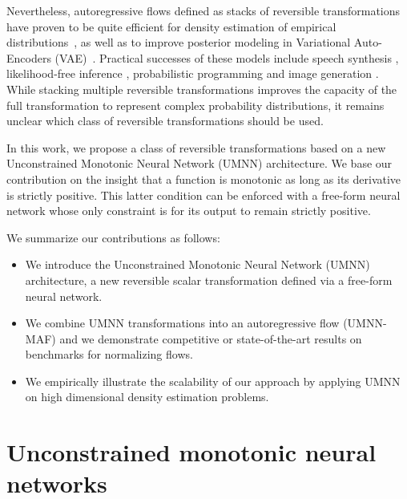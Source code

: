 Nevertheless, autoregressive flows defined as stacks of reversible transformations have proven to be quite efficient for density estimation of empirical distributions~\citep{papamakarios_sequential_2019, papamakarios_masked_2017, huang_neural_2018}, as well as to improve posterior modeling in Variational Auto-Encoders (VAE)~\citep{germain_made_2015, kingma_improved_2016, huang_neural_2018}.
Practical successes of these models include speech synthesis \citep{van_den_oord_wavenet_2016, van_den_oord_parallel_2018}, likelihood-free inference \citep{papamakarios_sequential_2019}, probabilistic programming \citep{van_de_meent_introduction_2018} and image generation \citep{kingma_glow_2018}.
While stacking multiple reversible transformations improves the capacity of the full transformation to represent complex probability distributions, it remains unclear which class of reversible transformations should be used.

In this work, we propose a class of reversible transformations based on a new Unconstrained Monotonic Neural Network (UMNN) architecture. We base our contribution on the insight that a function is monotonic as long as its derivative is strictly positive. This latter condition can be enforced with a free-form neural network whose only constraint is for its output to remain strictly positive.

We summarize our contributions as follows:
\begin{itemize}
    \item We introduce the Unconstrained Monotonic Neural Network (UMNN) architecture, a new reversible scalar transformation defined via a free-form neural network.
    \item We combine UMNN transformations into an autoregressive flow (UMNN-MAF) and we demonstrate competitive or state-of-the-art results on benchmarks for normalizing flows.
    \item We empirically illustrate the scalability of our approach by applying UMNN on high dimensional density estimation problems.
\end{itemize}



\section{Unconstrained monotonic neural networks}
\label{umnn}

